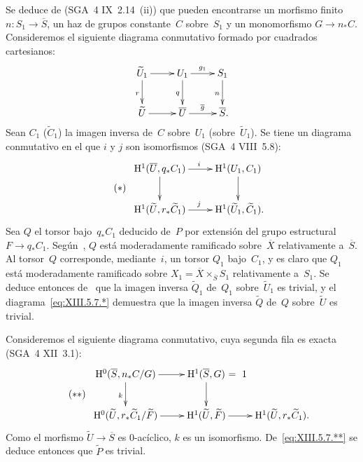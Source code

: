 Se deduce de (SGA~4 IX~2.14~(ii)) que pueden encontrarse un morfismo
finito $n\colon S_1\to\overline{S}$, un haz de grupos constante~$C$
sobre~$S_1$ y un monomorfismo $G\to n_*C$. Consideremos el siguiente
diagrama conmutativo formado por cuadrados cartesianos:
$$
\xymatrix{ \widetilde{U}_{1} \ar[r] \ar[d]_{r} &U_{1} \ar[r]^{g_{1}}
\ar[d]_{q} &S_{1} \ar[d]_{n} \cr \widetilde{U} \ar[r] &\overline{U}
\ar[r]^{\overline{g}} &\overline{S} \rlap{\quoi.}\cr }
$$
Sean
$C_1$ (\resp $\widetilde{C}_1$) la imagen inversa de~$C$ sobre~$U_1$
(\resp sobre~$\widetilde{U}_1$). Se tiene un diagrama conmutativo en el
que $i$ y $j$ son isomorfismos (SGA~4 VIII~5.8):
\begin{equation*}
\label{eq:XIII.5.7.*}
\tag{$*$}
\begin{array}{c}
\xymatrix{ \H^{1}(\overline{U},q_*C_{1}) \ar[r]^{i}
\ar[d] &\H^{1}(U_{1},C_{1}) \ar[d] \cr
\H^{1}(\widetilde{U},r_*\widetilde{C}_{1}) \ar[r]^{j}
&\H^{1}(\widetilde{U}_{1},\widetilde{C}_{1}) \rlap{\quoi.}\cr }
\end{array}
\end{equation*}
Sea $Q$ el torsor bajo~$q_*C_1$ deducido de~$P$ por extensión del grupo
estructural $F\to q_*C_1$. Según~, $Q$ está
moderadamente ramificado sobre~$\overline{X}$ relativamente
a~$\overline{S}$. Al torsor~$Q$ corresponde, mediante~$i$, un torsor
$Q_1$ bajo~$C_1$, y es claro que $Q_1$ está moderadamente ramificado
sobre $X_1=\overline{X}\times_{\overline{S}}S_1$ relativamente a~$S_1$.
Se deduce entonces de~ que la imagen inversa
$\widetilde{Q}_1$ de~$Q_1$ sobre~$\widetilde{U}_1$ es trivial, y el
diagrama~\eqref{eq:XIII.5.7.*} demuestra que la imagen inversa
$\widetilde{Q}$ de~$Q$ sobre~$\widetilde{U}$ es trivial.

Consideremos el siguiente diagrama conmutativo, cuya segunda fila es
exacta (SGA~4 XII~3.1):
\begin{equation*}
\label{eq:XIII.5.7.**}
\tag{$**$}
\begin{array}{c}
\xymatrix{ \H^{0}(\overline{S},n_*C/G) \ar[r]
\ar[d]_{k} &\H^{1}(\overline{S},G)\rlap{$~=~1$} \ar[d] \cr
\H^{0}(\widetilde{U},r_*\widetilde{C}_{1}/\widetilde{F}) \ar[r]
&\H^{1}(\widetilde{U},\widetilde{F}) \ar[r]
&\H^{1}(\widetilde{U},r_*\widetilde{C}_{1}) \rlap{\quoi.} \cr }
\end{array}
\end{equation*}
Como el morfismo $\widetilde{U}\to\overline{S}$ es $0$-acíclico,
$k$ es un isomorfismo. De~\eqref{eq:XIII.5.7.**} se deduce entonces
que $\widetilde{P}$ es trivial.
